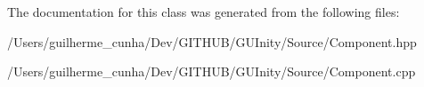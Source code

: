 The documentation for this class was generated from the following files\+:\begin{DoxyCompactItemize}
\item 
/\+Users/guilherme\+\_\+cunha/\+Dev/\+G\+I\+T\+H\+U\+B/\+G\+U\+Inity/\+Source/Component.\+hpp\item 
/\+Users/guilherme\+\_\+cunha/\+Dev/\+G\+I\+T\+H\+U\+B/\+G\+U\+Inity/\+Source/Component.\+cpp\end{DoxyCompactItemize}
